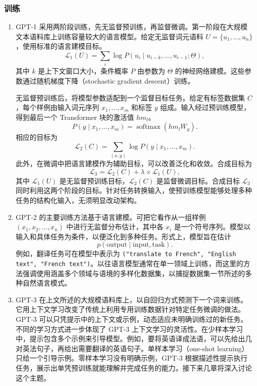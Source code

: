 \subsubsection{训练}
\begin{enumerate}
\item GPT-1 采用两阶段训练，先无监督预训练，再监督微调。第一阶段在大规模文本语料库上训练容量较大的语言模型。给定无监督词元语料 $U=\{u_1,\ldots,u_n\}$，使用标准的语言建模目标。
\begin{equation}
\mathcal{L}_1(U)=\sum_i\log P(u_i\mid u_{i-k},\ldots,u_{i-1};\Theta),
\tag{2.34}
\end{equation}
其中 $k$ 是上下文窗口大小，条件概率 $P$ 由参数为 $\Theta$ 的神经网络建模。这些参数通过随机梯度下降（stochastic gradient descent）训练。

无监督预训练后，将模型参数适配到一个监督目标任务。给定有标签数据集 $C$，每个样例由输入词元序列 $x_1,\ldots,x_m$ 和标签 $y$ 组成。输入经过预训练模型，得到最后一个 Transformer 块的激活值 $hm_l$。
\begin{equation}
P(y\mid x_1,\ldots,x_m)=\operatorname{softmax}(hm_lW_y).
\tag{2.35}
\end{equation}
相应的目标为
\begin{equation}
\mathcal{L}_2(C)=\sum_{(x,y)}\log P(y\mid x_1,\ldots,x_m).
\tag{2.36}
\end{equation}
此外，在微调中把语言建模作为辅助目标，可以改善泛化和收敛。合成目标为
\begin{equation}
\mathcal{L}_3=\mathcal{L}_2(C)+\lambda\times\mathcal{L}_1(U),
\tag{2.37}
\end{equation}
其中 $\mathcal{L}_1(U)$ 是无监督预训练目标，$\mathcal{L}_2(C)$ 是监督微调目标。合成目标 $\mathcal{L}_3$ 同时利用这两个阶段的目标。针对任务转换输入，使预训练模型能够处理多种任务的结构化输入，无须明显改动架构。

\item GPT-2 的主要训练方法基于语言建模。可把它看作从一组样例 $(x_1,x_2,\ldots,x_n)$ 中进行无监督分布估计，其中各 $x_i$ 是一个符号序列。模型以输入和具体任务为条件，以便泛化到多种任务。形式上，模型旨在估计
\begin{equation}
p(\text{output}\mid\text{input},\text{task}).
\tag{2.38}
\end{equation}
例如，翻译任务可在模型中表示为 \texttt{("translate to French", "English text", "French text")}。以往语言模型通常在单一领域上训练，而这里的方法强调使用涵盖多个领域与语境的多样化数据集，以捕捉数据集一节所述的多种自然语言模式。

\item GPT-3 在上文所述的大规模语料库上，以自回归方式预测下一个词来训练。它用上下文学习改变了传统上利用专用训练数据针对特定任务微调的做法。GPT-3 可以只凭提示中的上下文或示例，动态适应未明确训练过的新任务。不同的学习方式进一步体现了 GPT-3 上下文学习的灵活性。在少样本学习中，提示包含多个示例来引导模型。例如，要将英语译成法语，可以先给出几对英法句子，再给出需要翻译的英语句子。单样本学习（one-shot learning）只给一个引导示例。零样本学习没有明确示例，GPT-3 根据描述性提示执行任务，展示出单凭预训练就能理解并完成任务的能力。接下来几章将深入讨论这个主题。
\end{enumerate}

